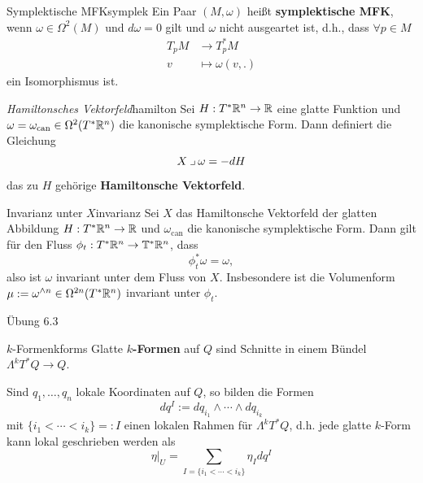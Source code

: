 \begin{definition}{Symplektische MFK}{symplek}
Ein Paar $(M, \omega)$ heißt \textbf{symplektische MFK}, wenn $\omega \in \Omega^2 (M)$ und $d\omega = 0$ gilt und $\omega$ nicht ausgeartet ist, d.h., dass $\forall p \in M$ 
\begin{align}
T_pM &\to T_p^\ast M \\
v &\mapsto \omega(v, .)
\end{align}
ein Isomorphismus ist.
\end{definition}
\begin{definition}{\textit{Hamiltonsches Vektorfeld}}{hamilton}
Sei $H: T^\ast \mathbb{R}^n \to \mathbb{R}$ eine glatte Funktion und $\omega = \omega_\text{can} \in \Omega^2(T^\ast \mathbb{R}^n)$ die kanonische symplektische Form. Dann definiert die Gleichung
\begin{equation}
X \mathbin{\lrcorner} \omega = -dH
\end{equation}
das zu $H$ gehörige \textbf{Hamiltonsche Vektorfeld}.
\end{definition}
\begin{satz}{Invarianz unter $X$}{invarianz}
Sei $X$ das Hamiltonsche Vektorfeld der glatten Abbildung $H: T^\ast \mathbb{R}^n \to \mathbb{R}$ und $\omega_\text{can}$ die kanonische symplektische Form. Dann gilt für den Fluss $\phi_t: T^\ast \mathbb{R}^n \to \mathbb{T}^\ast \mathbb{R}^n$, dass 
\begin{equation}
\phi_t^\ast \omega = \omega,
\end{equation}
also ist $\omega$ invariant unter dem Fluss von $X$. Insbesondere ist die Volumenform $\mu:= \omega^{\wedge n} \in \Omega^{2n}(T^\ast \mathbb{R}^n)$ invariant unter $\phi_t$.
\end{satz}
\begin{beweis}
Übung 6.3
\end{beweis}
\begin{definition}{$k$-Formen}{kforms}
Glatte $k$\textbf{-Formen} auf $Q$ sind Schnitte in einem Bündel $\Lambda^k T^\ast Q \to Q$.
\end{definition}
Sind $q_1, \dots, q_n$ lokale Koordinaten auf $Q$, so bilden die Formen
\begin{equation}
dq^I := dq_{i_1} \wedge \cdots \wedge dq_{i_k}
\end{equation}
mit $\{ i_1 < \cdots < i_k \} =: I$ einen lokalen Rahmen für $\Lambda^k T^\ast Q$, d.h. jede glatte $k$-Form kann lokal geschrieben werden als
\begin{equation}
\eta|_U = \sum_{I = \{i_1 < \cdots  < i_k \}} \eta_I dq^I
\end{equation}
